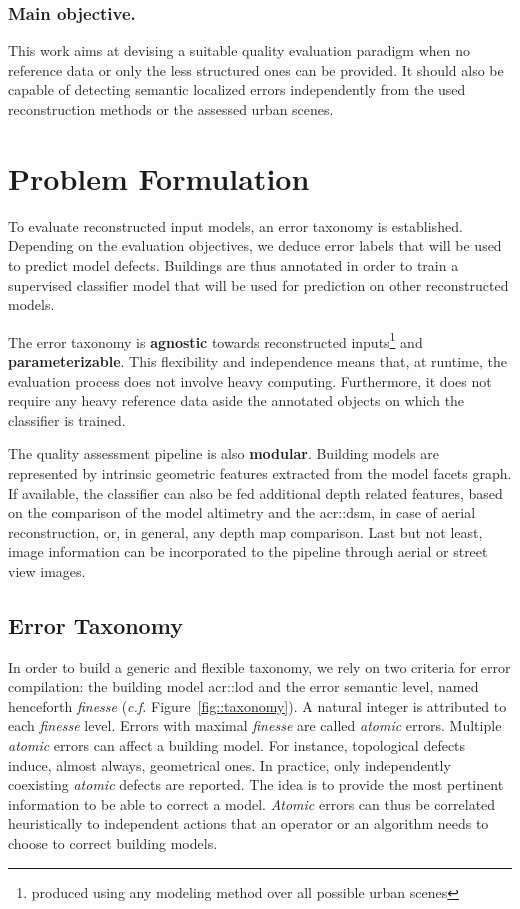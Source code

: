 \documentclass[runningheads]{llncs}
\begin{document}
\subsubsection{Main objective.}
This work aims at devising a suitable quality evaluation paradigm when no reference data or only the less structured ones can be provided. It should also be capable of detecting semantic localized errors independently from the used reconstruction methods or the assessed urban scenes.

\section{Problem Formulation}

To evaluate reconstructed input models, an error taxonomy is established. Depending on the evaluation objectives, we deduce error labels that will be used to predict model defects. Buildings are thus annotated in order to train a supervised classifier model that will be used for prediction on other reconstructed models.

The error taxonomy is \textbf{agnostic} towards reconstructed inputs\footnote{produced using any modeling method over all possible urban scenes} and \textbf{parameterizable}. This flexibility and independence means that, at runtime, the evaluation process does not involve heavy computing. Furthermore, it does not require any heavy reference data aside the annotated objects on which the classifier is trained.

The quality assessment pipeline is also \textbf{modular}. Building models are represented by intrinsic geometric features extracted from the model facets graph. If available, the classifier can also be fed additional depth related features, based on the comparison of the model altimetry and the \acrshort{acr::dsm}, in case of aerial reconstruction, or, in general, any depth map comparison. Last but not least, image information can be incorporated to the pipeline through aerial or street view images.

\subsection{Error Taxonomy}
In order to build a generic and flexible taxonomy, we rely on two criteria for error compilation: the building model \acrshort{acr::lod} and the error semantic level, named henceforth \textit{finesse} (\textit{c.f.} Figure~\ref{fig::taxonomy}). A natural integer is attributed to each \textit{finesse} level. Errors with maximal \textit{finesse} are called \textit{atomic} errors. Multiple \textit{atomic} errors can affect a building model. For instance, topological defects induce, almost always, geometrical ones. In practice, only independently coexisting \textit{atomic} defects are reported. The idea is to provide the most pertinent information to be able to correct a model. \textit{Atomic} errors can thus be correlated heuristically to independent actions that an operator or an algorithm needs to choose to correct building models.
\end{document}
